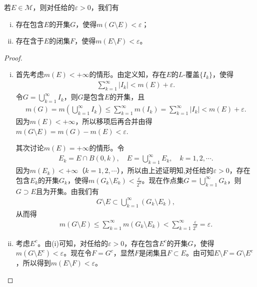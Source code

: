 \documentclass[../../main.tex]{subfiles}%
\begin{document}
\begin{theorem}\label{theorem:定理2.13}
若$E\in\mathscr{M}$，则对任给的$\varepsilon > 0$，我们有
\begin{enumerate}[(i)]
\item 存在包含$E$的开集$G$，使得$m(G\setminus E)<\varepsilon$；
\item 存在含于$E$的闭集$F$，使得$m(E\setminus F)<\varepsilon$。
\end{enumerate}
\end{theorem}
\begin{proof}
\begin{enumerate}[(i)]
\item 首先考虑$m(E)<+\infty$的情形。由定义知，存在$E$的$L$-覆盖$\{I_k\}$，使得
\begin{align*}
\sum_{k = 1}^{\infty}|I_k|<m(E)+\varepsilon.
\end{align*}
令$G = \bigcup_{k = 1}^{\infty}I_k$，则$G$是包含$E$的开集，且
\begin{align*}
m\left( G \right) =m\left( \bigcup_{k=1}^{\infty}{I_k} \right) \leqslant \sum_{k=1}^{\infty}{m\left( I_k \right)}=\sum_{k=1}^{\infty}{\left| I_k \right|}<m(E)+\varepsilon .
\end{align*}
因为$m(E)<+\infty$，所以移项后再合并由得$m(G\setminus E)=m(G)-m(E)<\varepsilon.$

其次讨论$m(E)=+\infty$的情形。令
\begin{align*}
E_k = E\cap B(0,k),\quad E=\bigcup_{k = 1}^{\infty}E_k,\quad k = 1,2,\cdots.
\end{align*}
因为$m(E_k)<+\infty$（$k = 1,2,\cdots$），所以由上述证明知,对任给的$\varepsilon>0$，存在包含$E_k$的开集$G_k$，使得$m(G_k\setminus E_k)<\frac{\varepsilon}{2^k}$。现在作点集$G = \bigcup_{k = 1}^{\infty}G_k$，则$G\supset E$且为开集。由我们有
\begin{align*}
G\setminus E\subset\bigcup_{k = 1}^{\infty}(G_k\setminus E_k),
\end{align*}
从而得
\begin{align*}
m(G\setminus E)\leqslant\sum_{k = 1}^{\infty}m(G_k\setminus E_k)<\sum_{k = 1}^{\infty}\frac{\varepsilon}{2^k}=\varepsilon.
\end{align*}
\item 考虑$E^c$。由(i)可知，对任给的$\varepsilon>0$，存在包含$E^c$的开集$G$，使得$m(G\setminus E^c)<\varepsilon$。现在令$F = G^c$，显然$F$是闭集且$F\subset E$。由可知$E\setminus F = G\setminus E^c$，所以得到$m(E\setminus F)<\varepsilon$。
\end{enumerate}
\end{proof}
\end{document}
